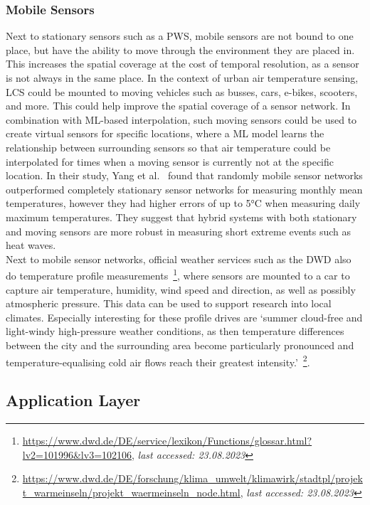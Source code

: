 \subsubsection{Mobile Sensors}

Next to stationary sensors such as a PWS, mobile sensors are not bound to one place, but have the ability to move through the environment they are placed in. This increases the spatial coverage at the cost of temporal resolution, as a sensor is not always in the same place. In the context of urban air temperature sensing, LCS could be mounted to moving vehicles such as busses, cars, e-bikes, scooters, and more. This could help improve the spatial coverage of a sensor network. In combination with ML-based interpolation, such moving sensors could be used to create virtual sensors for specific locations, where a ML model learns the relationship between surrounding sensors so that air temperature could be interpolated for times when a moving sensor is currently not at the specific location. In their study, Yang et al.~\cite{yang2019designing} found that randomly mobile sensor networks outperformed completely stationary sensor networks for measuring monthly mean temperatures, however they had higher errors of up to 5°C when measuring daily maximum temperatures. They suggest that hybrid systems with both stationary and moving sensors are more robust in measuring short extreme events such as heat waves.\\
Next to mobile sensor networks, official weather services such as the DWD also do temperature profile measurements~\footnote{\url{https://www.dwd.de/DE/service/lexikon/Functions/glossar.html?lv2=101996&lv3=102106}, \textit{last accessed: 23.08.2023}}, where sensors are mounted to a car to capture air temperature, humidity, wind speed and direction, as well as possibly atmospheric pressure. This data can be used to support research into local climates. Especially interesting for these profile drives are `summer cloud-free and light-windy high-pressure weather conditions, as then temperature differences between the city and the surrounding area become particularly pronounced and temperature-equalising cold air flows reach their greatest intensity.'~\footnote{\url{https://www.dwd.de/DE/forschung/klima\_umwelt/klimawirk/stadtpl/projekt\_warmeinseln/projekt\_waermeinseln\_node.html}, \textit{last accessed: 23.08.2023}}.

\subsection{Application Layer}

